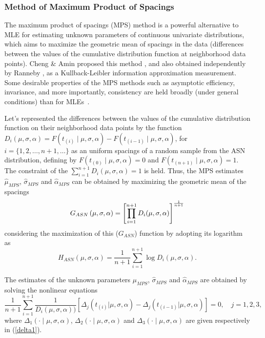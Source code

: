 \documentclass[]{interact}
\theoremstyle{plain}%
\theoremstyle{definition}
\theoremstyle{remark}
\begin{document}
\subsubsection{Method of Maximum Product of Spacings}

The maximum product of spacings (MPS) method is a powerful alternative to MLE for estimating unknown parameters of continuous univariate distributions, which aims to maximize the geometric mean of spacings in the data (differences between the values of the cumulative distribution function at neighborhood data points). Cheng \& Amin proposed this method \cite{cheng1979maximum, cheng1983estimating}, and also obtained independently by Ranneby \cite{ranneby1984maximum}, as a Kullback-Leibler information approximation measurement. Some desirable properties of the MPS methods such as asymptotic efficiency, invariance, and more importantly, consistency are held broadly (under general conditions) than for MLEs~\cite{cheng1983estimating}.

Let's represented the differences between the values of the cumulative distribution function on their neighborhood data points by the function $D_{i}(\mu,\sigma,\alpha)=F\left( t_{(i)}\mid\mu,\sigma,\alpha \right)
-F\left( t_{(i-1)}\mid \mu,\sigma,\alpha \right)$, for $i=\{1,2,\ldots ,n+1,\ldots \}$ as an uniform spacings of a random sample from the ASN distribution, defining by $F(t_{(0)}\mid \mu,\sigma,\alpha)=0$ and $F( t_{(n+1)} \mid \mu,\sigma,\alpha)=1$. The constraint of the
$\sum_{i=1}^{n+1} D_i (\mu,\sigma,\alpha) =1$ is held. Thus, the MPS estimates $\hat{\mu}_{MPS}$, $\hat{\sigma}_{MPS}$ and $\hat{\alpha}_{MPS}$ can be obtained by maximizing the geometric
mean of the spacings
\begin{equation}
G_{ASN}\left( \mu,\sigma,\alpha\right) =\left[ \prod\limits_{i=1}^{n+1}D_{i}( \mu,\sigma,\alpha)\right] ^{%
\frac{1}{n+1}} \label{G}
\end{equation}%
considering the maximization of this ($G_{ASN}$) function by adopting its logarithm as
\begin{equation}
H_{ASN}\left( \mu,\sigma,\alpha\right) =\frac{1}{n+1}\sum_{i=1}^{n+1}\log
D_{i} ( \mu,\sigma,\alpha).
\end{equation}

The estimates of the unknown parameters $\hat{\mu}_{MPS}$, $\hat{\sigma}_{MPS}$ and $\hat{\alpha}_{MPS}$ are obtained by solving the nonlinear equations
\begin{equation}
\frac{1}{n+1}%
\sum\limits_{i=1}^{n+1}\frac{1}{D_{i}(\mu,\sigma,\alpha))} \left[ \Delta_j
(t_{(i)} |  \mu,\sigma,\alpha) - \Delta_j (t_{(i-1)} |  \mu,\sigma,\alpha)
\right] =0, \quad j=1,2,3,
\end{equation}
where $\Delta _{1}\left( \cdot \mid \mu,\sigma,\alpha \right)$, $\Delta _{2}\left( \cdot \mid \mu,\sigma,\alpha \right) $ and
$\Delta_{3}\left( \cdot \mid \mu,\sigma,\alpha \right) $ are given respectively in (\ref{delta1}). 
\end{document}
